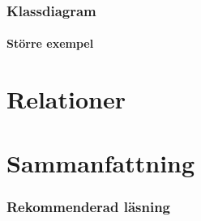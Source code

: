 \documentclass[aspectratio=169]{beamer}
\begin{document}
\begin{frame}[fragile]
    \frametitle{Klassdiagram}
    \framesubtitle{Större exempel}

    \centering
    

\end{frame}

\section{Relationer}

\section{Sammanfattning}

\begin{frame}
    \frametitle{Rekommenderad läsning}


\end{frame}
\end{document}
